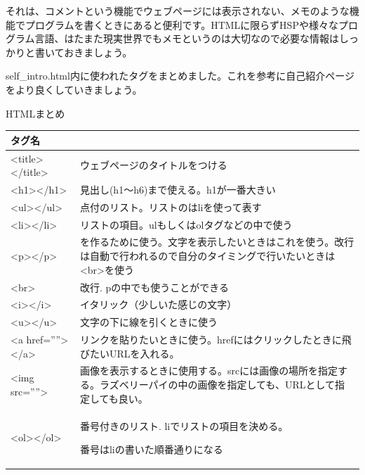 \documentclass[a4paper,12pt,dvipdfmx]{jarticle}
\begin{document}
それは、コメントという機能でウェブページには表示されない、メモのような機能でプログラムを書くときにあると便利です。HTMLに限らずHSPや様々なプログラム言語、はたまた現実世界でもメモというのは大切なので必要な情報はしっかりと書いておきましょう。

self\_intro.html内に使われたタグをまとめました。これを参考に自己紹介ページをより良くしていきましょう。

\clearpage
HTMLまとめ\ \

\begin{center}
	\tablefirsthead{}
	\tablehead{}
	\tabletail{}
	\tablelasttail{}
	\begin{supertabular}{|m{4.0cm}|m{12.0cm}|}
		\hline
		タグ名 &

		\\\hline

		{\textless}title{\textgreater}{\textless}/title{\textgreater} &
		ウェブページのタイトルをつける\\\hline
		{\textless}h1{\textgreater}{\textless}/h1{\textgreater} &
		見出し(h1～h6)まで使える。h1が一番大きい\\\hline
		{\textless}ul{\textgreater}{\textless}/ul{\textgreater} &

		点付のリスト。リストのはliを使って表す\\\hline
		{\textless}li{\textgreater}{\textless}/li{\textgreater} &
		リストの項目。ulもしくはolタグなどの中で使う\\\hline
		{\textless}p{\textgreater}{\textless}/p{\textgreater} &
		を作るために使う。文字を表示したいときはこれを使う。改行は自動で行われるので自分のタイミングで行いたいときは{\textless}br{\textgreater}を使う\\\hline
		{\textless}br{\textgreater} &
		改行. pの中でも使うことができる\\\hline
		{\textless}i{\textgreater}{\textless}/i{\textgreater} &
		イタリック（少しいた感じの文字）\\\hline
		{\textless}u{\textgreater}{\textless}/u{\textgreater} &
		文字の下に線を引くときに使う\\\hline
		{\textless}a href=””{\textgreater}{\textless}/a{\textgreater} &
		リンクを貼りたいときに使う。hrefにはクリックしたときに飛びたいURLを入れる。\\\hline
		{\textless}img src=””{\textgreater} &
		画像を表示するときに使用する。srcには画像の場所を指定する。ラズベリーパイの中の画像を指定しても、URLとして指定しても良い。\\\hline
		{\textless}ol{\textgreater}{\textless}/ol{\textgreater} &
		番号付きのリスト.
		liでリストの項目を決める。

		番号はliの書いた順番通りになる\\\hline
	\end{supertabular}
\end{center}
\end{document}
